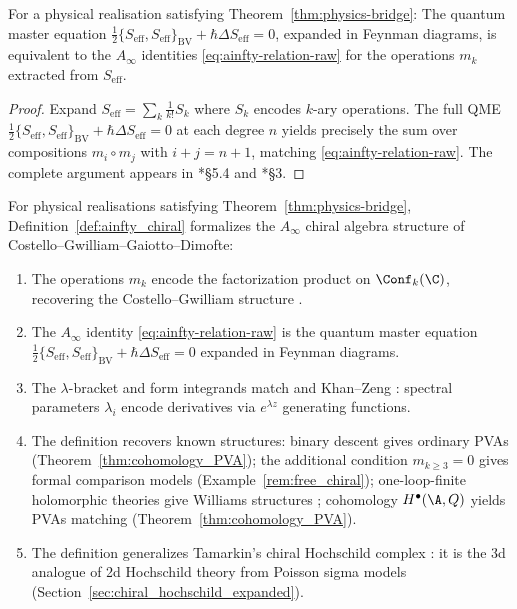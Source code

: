 \begin{lemma}
\label{lem:QME_to_Ainfty}
For a physical realisation satisfying Theorem~\ref{thm:physics-bridge}:
The quantum master equation $\frac{1}{2}\{S_{\mathrm{eff}},S_{\mathrm{eff}}\}_{\mathrm{BV}} + \hbar\Delta S_{\mathrm{eff}}=0$, expanded in Feynman diagrams, is equivalent to the $A_\infty$ identities \eqref{eq:ainfty-relation-raw} for the operations $m_k$ extracted from $S_{\mathrm{eff}}$.
\end{lemma}

\begin{proof}
Expand $S_{\mathrm{eff}} = \sum_k \frac{1}{k!} S_k$ where $S_k$ encodes $k$-ary operations. The full QME $\tfrac{1}{2}\{S_{\mathrm{eff}},S_{\mathrm{eff}}\}_{\mathrm{BV}} + \hbar\Delta S_{\mathrm{eff}} = 0$ at each degree $n$ yields precisely the sum over compositions $m_i \circ m_j$ with $i+j=n+1$, matching \eqref{eq:ainfty-relation-raw}. The complete argument appears in \cite{CG17}*{\S5.4} and \cite{CDG20}*{\S3}.
\end{proof}

\begin{proposition}
\label{prop:physical_justification}
For physical realisations satisfying Theorem~\ref{thm:physics-bridge}, Definition~\ref{def:ainfty_chiral} formalizes the $A_\infty$ chiral algebra structure of Costello--Gwilliam--Gaiotto--Dimofte:

\begin{enumerate}[label=(\roman*)]
\item The operations $m_k$ encode the factorization product on $\Conf_k(\C)$, recovering the Costello--Gwilliam structure \cite{CG17}.

\item The $A_\infty$ identity \eqref{eq:ainfty-relation-raw} is the quantum master equation
$\frac{1}{2}\{S_{\mathrm{eff}}, S_{\mathrm{eff}}\}_{\mathrm{BV}} + \hbar \Delta S_{\mathrm{eff}} = 0$
expanded in Feynman diagrams.

\item The $\lambda$-bracket and form integrands match \cite{CDG20} and Khan--Zeng \cite{KZ25}: spectral parameters $\lambda_i$ encode derivatives via $e^{\lambda z}$ generating functions.

\item The definition recovers known structures:
binary descent gives ordinary PVAs (Theorem~\ref{thm:cohomology_PVA});
the additional condition $m_{k \geq 3}=0$ gives formal comparison
models (Example~\ref{rem:free_chiral});
one-loop-finite holomorphic theories give Williams structures \cite{GGW21};
cohomology $H^\bullet(\A,Q)$ yields PVAs matching \cite{CDG20} (Theorem~\ref{thm:cohomology_PVA}).

\item The definition generalizes Tamarkin's chiral Hochschild complex \cite{Tam02}: it is the 3d analogue of 2d Hochschild theory from Poisson sigma models (Section~\ref{sec:chiral_hochschild_expanded}).
\end{enumerate}
\end{proposition}


